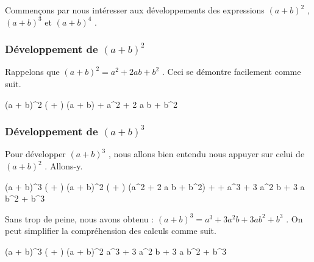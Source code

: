 Commençons par nous intéresser aux développements des expressions
$(a + b)^2$ ,
$(a + b)^3$ et
$(a + b)^4$ .




\subsubsection{Développement de $(a + b)^2$}

Rappelons que  $(a + b)^2 = a^2 + 2 a b + b^2$ .
Ceci se démontre facilement comme suit.

\medskip

\begin{stepcalc}[style = sar]
	(a + b)^2
		\explnext{}
	( + ) (a + b)
		\explnext{}
	 + 
		\explnext{}
	a^2 + 2 a b + b^2
\end{stepcalc}




\subsubsection{Développement de $(a + b)^3$}

Pour développer $(a + b)^3$ , nous allons bien entendu nous appuyer sur celui de $(a + b)^2$ . Allons-y.

\medskip

\begin{stepcalc}[style = sar]
	(a + b)^3
		\explnext{}
	( + ) (a + b)^2
		\explnext{}
	( + ) (a^2 + 2 a b + b^2)
		\explnext{}
	+
		\explnext{}
	+
		\explnext{}
	a^3 + 3 a^2 b + 3 a b^2 + b^3
\end{stepcalc}

\medskip

Sans trop de peine, nous avons obtenu :
$(a + b)^3 = a^3 + 3 a^2 b + 3 a b^2 + b^3$ . On peut simplifier la compréhension des calculs comme suit.

\medskip

\begin{stepcalc}[style = sar]
	(a + b)^3
		\explnext{}
	( + ) (a + b)^2
		\explnext{}
		\explnext[\hideit+]{}
	\phantom{x}\kern4pt%
		\explnext{}
		\explnext[\hideit+]{}
	\phantom{x}\kern4pt%
		\explnext{}
		\explnext[\hideit+]{}
	\phantom{x}\kern4pt%
		\explnext{}
	a^3 + 3 a^2 b + 3 a b^2 + b^3
\end{stepcalc}


